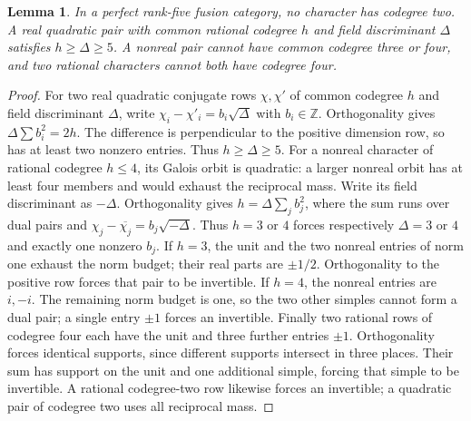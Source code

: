 \documentclass[11pt,a4paper]{article}
\newtheorem{lemma}[theorem]{Lemma}
\numberwithin{equation}{section}
\begin{document}
\begin{lemma}\label{lem:small-complement}
In a perfect rank-five fusion category, no character has codegree two.
A real quadratic pair with common rational codegree $h$ and field
discriminant $\Delta$ satisfies $h\ge\Delta\ge5$.
A nonreal pair cannot have common codegree three or four, and two
rational characters cannot both have codegree four.
\end{lemma}
\begin{proof}
For two real quadratic
conjugate rows $\chi,\chi'$ of common codegree $h$ and field
discriminant $\Delta$, write $\chi_i-\chi'_i=b_i\sqrt\Delta$
with $b_i\in\mathbb Z$. Orthogonality gives
$\Delta\sum b_i^2=2h$. The difference is perpendicular to the positive
dimension row, so has at least two nonzero entries. Thus $h\ge\Delta
\ge5$. For a nonreal character of rational codegree $h\le4$, its Galois
orbit is quadratic: a larger nonreal orbit has at least four members
and would exhaust the reciprocal mass. Write its field discriminant
as $-\Delta$. Orthogonality gives
$h=\Delta\sum_j b_j^2$, where the sum runs over dual pairs and
$\chi_j-\overline{\chi_j}=b_j\sqrt{-\Delta}$.
Thus $h=3$ or $4$ forces respectively $\Delta=3$ or $4$ and exactly
one nonzero $b_j$. If $h=3$, the unit and the two nonreal entries of
norm one exhaust the norm budget; their real parts are $\pm1/2$.
Orthogonality to the positive row forces that pair to be invertible.
If $h=4$, the nonreal entries are $i,-i$. The remaining norm budget
is one, so the two other simples cannot form a dual pair; a single
entry $\pm1$ forces an invertible. Finally
two rational rows of codegree four each have the unit and three
further entries $\pm1$. Orthogonality forces identical supports, since
different supports intersect in three places. Their sum has support
on the unit and one additional simple, forcing that simple to be
invertible. A rational codegree-two row likewise forces an invertible;
a quadratic pair of codegree two uses all reciprocal mass.
\end{proof}
\end{document}
